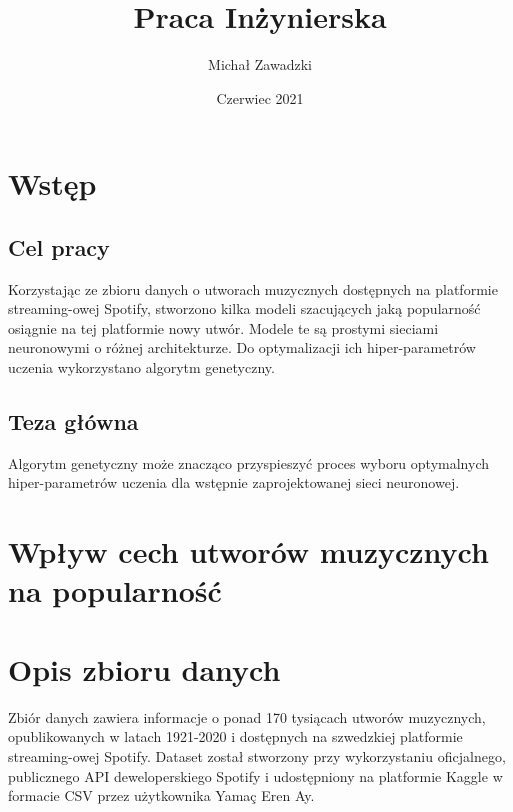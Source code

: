 \documentclass[a4paper,11pt]{article}
\title{Praca Inżynierska}
\author{Michał Zawadzki}
\date{Czerwiec 2021}
\begin{document}
    \maketitle

    \tableofcontents


    \section{Wstęp}

    \subsection{Cel pracy}
    Korzystając ze zbioru danych o utworach muzycznych dostępnych na platformie streaming-owej Spotify, stworzono kilka modeli szacujących jaką popularność osiągnie na tej platformie nowy utwór. Modele te są prostymi sieciami neuronowymi o różnej architekturze. Do optymalizacji ich hiper-parametrów uczenia wykorzystano algorytm genetyczny.

    \subsection{Teza główna}
    Algorytm genetyczny może znacząco przyspieszyć proces wyboru optymalnych hiper-parametrów uczenia dla wstępnie zaprojektowanej sieci neuronowej.


    \section{Wpływ cech utworów muzycznych na popularność}


    \section{Opis zbioru danych}
    Zbiór danych zawiera informacje o ponad 170 tysiącach utworów muzycznych, opublikowanych w latach 1921-2020 i dostępnych na szwedzkiej platformie streaming-owej Spotify. Dataset został stworzony przy wykorzystaniu oficjalnego, publicznego API deweloperskiego Spotify i udostępniony na platformie Kaggle w formacie CSV przez użytkownika Yamaç Eren Ay.
\end{document}
